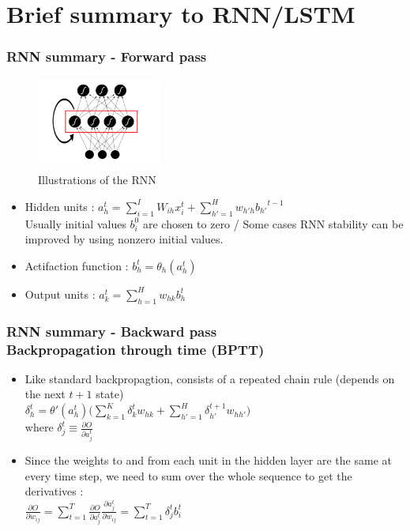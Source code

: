 \documentclass{beamer}
\begin{document}
\section{Brief summary to RNN/LSTM}
\frame
{
    \frametitle{RNN summary - Forward pass}
	\begin{figure}[ht]  
		\begin{center}
			\includegraphics[width=1.6in]{Images/recurrentNN.png}   
		\end{center}   
		\caption{Illustrations of the RNN}
	\end{figure}
    \begin{itemize}
        \item Hidden units : 
        $ a_h^t = {\sum_{i=1}^I} W_{ih}x_i^t + \sum_{h'=1}^H w_{h'h} {b_{h'}}^{t-1} $ \\
        Usually initial values $b_i^0$ are chosen to zero / 
        Some cases RNN stability can be improved by using nonzero initial values.
        \item Actifaction function :
        $ b_h^t = \theta_h(a_h^t) $
        \item Output units : 
        $ a_k^t = \sum_{h=1}^H w_{hk}b_h^t $
    \end{itemize}
}
\frame
{
    \frametitle{RNN summary - Backward pass \\ Backpropagation through time (BPTT)}
    \begin{itemize}
        \item Like standard backpropagtion, consists of a repeated chain rule (depends on the next $t+1$ state) \\ 
            \vspace{0.1in}
            $ \delta_h^t = \theta'(a_h^t) \Big( \sum_{k=1}^K \delta_k^t w_{hk} + 
            \sum_{h'=1}^H \delta_{h'}^{t+1} w_{hh'} \Big)$ \\
            \vspace{0.1in}
            where $\delta_j^t \equiv \frac{\partial O}{\partial a_j^t} $
        \item Since the weights to and from each unit in the hidden layer are the same at every time step, 
            we need to sum over the whole sequence to get the derivatives : \\
            \vspace{0.1in}
            $ \frac{\partial O}{\partial w_{ij}} = \sum_{t=1}^T \frac{\partial O}{\partial a_j^t} \frac{\partial a_j^t}{\partial w_{ij}} = \sum_{t=1}^T \delta_j^t b_i^t $
    \end{itemize}
}
\end{document}
